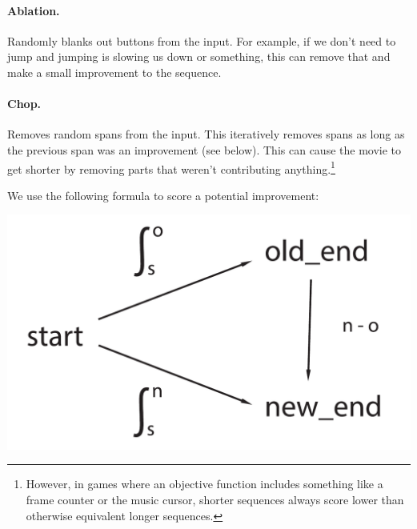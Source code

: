 \documentclass[twocolumn]{article}
\begin{document}
\paragraph{Ablation.} Randomly blanks out buttons from the input. For
example, if we don't need to jump and jumping is slowing us down or
something, this can remove that and make a small improvement to the
sequence.

\paragraph{Chop.} Removes random spans from the input. This iteratively
removes spans as long as the previous span was an improvement (see
below). This can cause the movie to get shorter by removing parts that
weren't contributing anything.\footnote{However, in games where an
  objective function includes something like a frame counter or the
  music cursor, shorter sequences always score lower than
  otherwise equivalent longer sequences.}

We use the following formula to score a potential improvement:

\begin{center}
\includegraphics[width=0.95 \linewidth]{isimprovement}
\end{center}
\end{document}
